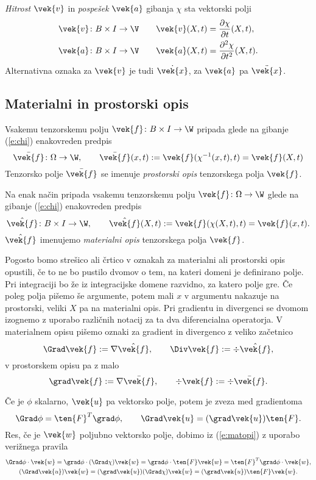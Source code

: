 \emph{Hitrost} $\vek{v}$ in \emph{pospešek} $\vek{a}$ gibanja $\chi$ sta vektorski polji
\begin{align}
	\vek{v}\colon B\times I\to \V \qquad & \vek{v}(X,t) = \frac{\partial\chi}{\partial t}(X,t), \label{e:v} \\
	\vek{a}\colon B\times I\to \V \qquad & \vek{a}(X,t) = \frac{\partial^2\chi}{\partial t^2}(X,t). \label{e:a}
\end{align}
Alternativna oznaka za $\vek{v}$ je tudi $\dot{\vek{x}}$, za $\vek{a}$ pa $\ddot{\vek{x}}$.


\subsection{Materialni in prostorski opis}


Vsakemu tenzorskemu polju $\vek{f}\colon B\times I\to\W$ pripada glede na gibanje
(\ref{e:chi}) enakovreden predpis
\[
	\bar{\vek{f}}\colon\Omega\to\W,\qquad
	\bar{\vek{f}}(x,t):=\vek{f}(\chi^{-1}(x,t),t)=\vek{f}(X,t)
\]
Tenzorsko polje $\bar{\vek{f}}$ se imenuje \emph{prostorski opis} tenzorskega polja $\vek{f}$.

Na enak način pripada vsakemu tenzorskemu polju $\vek{f}\colon\Omega\to\W$
glede na gibanje (\ref{e:chi}) enakovreden predpis
\begin{equation} \label{e:matopi}
	\hat{\vek{f}}\colon B\times I\to\W,\qquad
	\hat{\vek{f}}(X,t):=\vek{f}(\chi(X,t),t)=\vek{f}(x,t).
\end{equation}
$\hat{\vek{f}}$ imenujemo \emph{materialni opis} tenzorskega polja $\vek{f}$.

Pogosto bomo strešico ali črtico v oznakah za materialni ali prostorski opis opustili,
če to ne bo pustilo dvomov o tem, na kateri domeni je definirano polje.
Pri integraciji bo že iz integracijske domene razvidno, za katero polje gre.
Če poleg polja pišemo še argumente, potem mali $x$ v argumentu nakazuje na prostorski,
veliki $X$ pa na materialni opis.
Pri gradientu in divergenci se dvomom izognemo z uporabo različnih notacij
za ta dva diferencialna operatorja.
V materialnem opisu pišemo oznaki za gradient in divergenco z veliko začetnico
\[ \Grad\vek{f}:=\nabla\hat{\vek{f}},\qquad \Div\vek{f}:=\div\hat{\vek{f}}, \]
v prostorskem opisu pa z malo
\[ \grad\vek{f}:=\nabla\bar{\vek{f}},\qquad \div\vek{f}:=\div\bar{\vek{f}}. \]

Če je $\phi$ skalarno, $\vek{u}$ pa vektorsko polje, potem je zveza med gradientoma
\begin{equation}\label{e:gz}
	\Grad\phi=\ten{F}^{T}\grad\phi,\qquad \Grad\vek{u}=(\grad\vek{u})\ten{F}.
\end{equation}
Res, če je $\vek{w}$ poljubno vektorsko polje, dobimo iz (\ref{e:matopi})
z uporabo verižnega pravila
\begin{gather*}
	\Grad\phi\cdot\vek{w}=\grad\phi\cdot(\Grad\chi)\vek{w}=
	\grad\phi\cdot \ten{F}\vek{w}=\ten{F}^{T}\grad\phi\cdot\vek{w}, \\
	(\Grad\vek{u})\vek{w}=(\grad\vek{u})(\Grad\chi)\vek{w}
	=(\grad\vek{u})\ten{F}\vek{w}.
\end{gather*}

